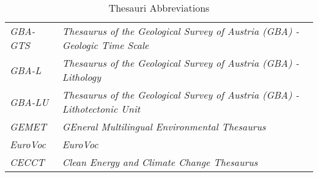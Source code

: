 \documentclass{llncs}
\begin{document}
\begin{table}[H]
\begin{tabular}{l|l}
		\emph{GBA-GTS} & \emph{Thesaurus of the Geological Survey of Austria (GBA) - Geologic Time Scale}\tablefootnote{\url{http://resource.geolba.ac.at/}} \\
		\emph{GBA-L} & \emph{Thesaurus of the Geological Survey of Austria (GBA) - Lithology}\tablefootnote{\url{http://resource.geolba.ac.at/}} \\
		\emph{GBA-LU} & \emph{Thesaurus of the Geological Survey of Austria (GBA) - Lithotectonic Unit}\tablefootnote{\url{http://resource.geolba.ac.at/}} \\
		\emph{GEMET} & \emph{GEneral Multilingual Environmental Thesaurus}\tablefootnote{\url{http://www.eionet.europa.eu/gemet/}} \\
		\emph{EuroVoc} & \emph{EuroVoc}\tablefootnote{\url{http://open-data.europa.eu/de/data/dataset/eurovoc}} \\
		\emph{CECCT} & \emph{Clean Energy and Climate Change Thesaurus}\tablefootnote{\url{http://data.reegle.info/thesaurus/guide}} \\
		\end{tabular}
	\caption{Thesauri Abbreviations}
	\label{tab:thesauri-abbreviations}
\end{table}
\end{document}
